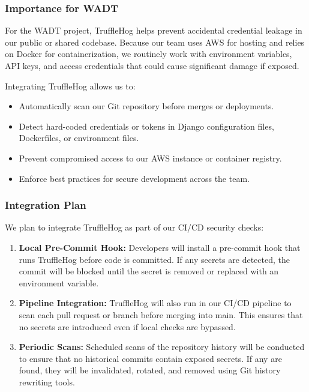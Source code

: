 \documentclass[12pt,titlepage]{article}
\begin{document}
\subsubsection{Importance for WADT}
For the WADT project, TruffleHog helps prevent accidental credential leakage in our public or shared codebase. Because our team uses AWS for hosting and relies on Docker for containerization, we routinely work with environment variables, API keys, and access credentials that could cause significant damage if exposed.

Integrating TruffleHog allows us to:
\begin{itemize}
    \item Automatically scan our Git repository before merges or deployments.
    \item Detect hard-coded credentials or tokens in Django configuration files, Dockerfiles, or environment files.
    \item Prevent compromised access to our AWS instance or container registry.
    \item Enforce best practices for secure development across the team.
\end{itemize}

\subsubsection{Integration Plan}
We plan to integrate TruffleHog as part of our CI/CD security checks:
\begin{enumerate}
    \item \textbf{Local Pre-Commit Hook:} Developers will install a pre-commit hook that runs TruffleHog before code is committed. If any secrets are detected, the commit will be blocked until the secret is removed or replaced with an environment variable.
    \item \textbf{Pipeline Integration:} TruffleHog will also run in our CI/CD pipeline to scan each pull request or branch before merging into main. This ensures that no secrets are introduced even if local checks are bypassed.
    \item \textbf{Periodic Scans:} Scheduled scans of the repository history will be conducted to ensure that no historical commits contain exposed secrets. If any are found, they will be invalidated, rotated, and removed using Git history rewriting tools.
\end{enumerate}
\end{document}
